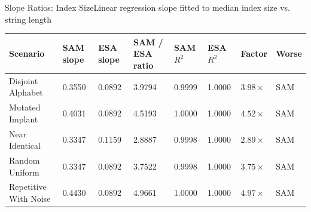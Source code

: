 \begin{benchmarktable}{Slope Ratios: Index Size}{Linear regression slope fitted to median index size vs. string length }
\begin{tabularx}{\textwidth}{|X|X|X|X|X|X|X|X|}
\toprule
Scenario & SAM slope & ESA slope & SAM / ESA ratio & SAM $R^2$ & ESA $R^2$ & Factor & Worse \\
\midrule
Disjoint Alphabet & 0.3550 & 0.0892 & 3.9794 & 0.9999 & 1.0000 & $3.98\times$ & SAM \\
\hline
Mutated Implant & 0.4031 & 0.0892 & 4.5193 & 1.0000 & 1.0000 & $4.52\times$ & SAM \\
\hline
Near Identical & 0.3347 & 0.1159 & 2.8887 & 0.9998 & 1.0000 & $2.89\times$ & SAM \\
\hline
Random Uniform & 0.3347 & 0.0892 & 3.7522 & 0.9998 & 1.0000 & $3.75\times$ & SAM \\
\hline
Repetitive With Noise & 0.4430 & 0.0892 & 4.9661 & 1.0000 & 1.0000 & $4.97\times$ & SAM \\
\bottomrule
\end{tabularx}
\end{benchmarktable}